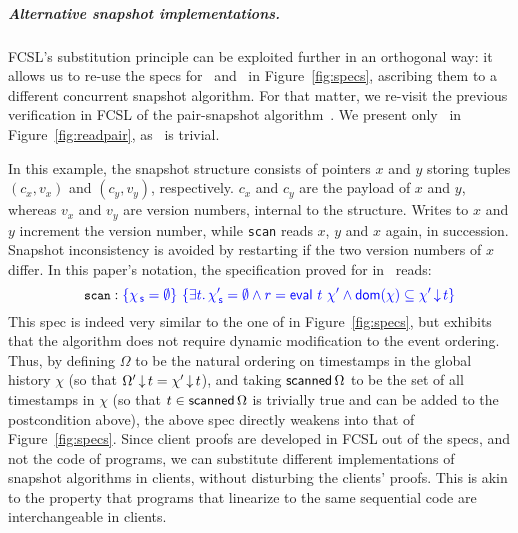 \documentclass[a4paper,UKenglish]{lipics-v2016}
\newcommand{\dom}[1]{\mathsf{dom}(#1)}
\newcommand{\esc}[1]{\text{\texttt{\small{#1}}}}
\newcommand{\selfsub}{\mathsf{s}}
\newcommand{\hist}{\chi}
\newcommand{\histS}{\hist_{\, \selfsub}}
\newcommand{\hempty}{\emptyset}
\newcommand{\ldot}{\mathord{.}\,}
\newcommand{\stableorder}{\Omega}
\newcommand{\stableorderP}{\stableorder'}
\newcommand{\histP}{\chi'}
\newcommand{\tsPos}[1]{\ensuremath{\textcolor{blue}{#1}}}
\theoremstyle{definition}
\begin{document}

\subparagraph*{Alternative snapshot implementations.}
FCSL's substitution principle can be exploited further in an
orthogonal way: it allows us to re-use the specs for \jywrite\ and
\jyscan\ in Figure~\ref{fig:specs}, ascribing them to a different
concurrent snapshot algorithm. For that matter, we re-visit the
previous verification in FCSL of the pair-snapshot
algorithm~\cite{SergeyNB+ESOP15}. We present only \jyscan\ in
Figure~\ref{fig:readpair}, as \jywrite\ is trivial.

In this example, the snapshot structure consists of pointers $x$ and
$y$ storing tuples $(c_x, v_x)$ and $(c_y, v_y)$, respectively. $c_x$
and $c_y$ are the payload of $x$ and $y$, whereas $v_x$ and $v_y$ are
version numbers, internal to the structure. Writes to $x$ and $y$
increment the version number, while {\tt scan} reads $x$, $y$ and $x$
again, in succession. Snapshot inconsistency is avoided by restarting
if the two version numbers of $x$ differ. In this paper's notation,
the specification proved for \jyscan in~\cite{SergeyNB+ESOP15} reads:
\[\hfill
\esc{scan} : \tsPos{\{\histS = \hempty\}}\
\tsPos{\{\exists t\ldot \histS' = \hempty \wedge
  r = \eval\ t\ \histP \wedge \dom{\hist}
  \subseteq \ideal{\histP}{t}\}}\hfill
\]
This spec is indeed very similar to the one of \jyscan in
Figure~\ref{fig:specs}, but exhibits that the algorithm does not
require dynamic modification to the event ordering. Thus, by defining
$\stableorder$ to be the natural ordering on timestamps in the global
history $\hist$ (so that $\ideal{\stableorderP}{t} =
\ideal{\histP}{t}$), and taking $\scanned{\stableorder}$ to be the set
of all timestamps in $\hist$ (so that $t \in \scanned{\stableorder}$
is trivially true and can be added to the postcondition above), the
above spec directly weakens into that of Figure~\ref{fig:specs}.
%
Since client proofs are developed in FCSL out of the specs, and not
the code of programs, we can substitute different implementations of
snapshot algorithms in clients, without disturbing the clients'
proofs.
%
This is akin to the property that programs that linearize to the same
sequential code are interchangeable in clients.
\end{document}
